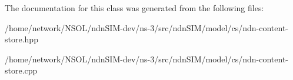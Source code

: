 The documentation for this class was generated from the following files\+:\begin{DoxyCompactItemize}
\item 
/home/network/\+N\+S\+O\+L/ndn\+S\+I\+M-\/dev/ns-\/3/src/ndn\+S\+I\+M/model/cs/ndn-\/content-\/store.\+hpp\item 
/home/network/\+N\+S\+O\+L/ndn\+S\+I\+M-\/dev/ns-\/3/src/ndn\+S\+I\+M/model/cs/ndn-\/content-\/store.\+cpp\end{DoxyCompactItemize}
